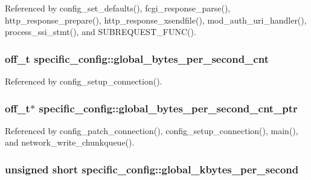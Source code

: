 Referenced by config\-\_\-set\-\_\-defaults(), fcgi\-\_\-response\-\_\-parse(), http\-\_\-response\-\_\-prepare(), http\-\_\-response\-\_\-xsendfile(), mod\-\_\-auth\-\_\-uri\-\_\-handler(), process\-\_\-ssi\-\_\-stmt(), and S\-U\-B\-R\-E\-Q\-U\-E\-S\-T\-\_\-\-F\-U\-N\-C().

\hypertarget{structspecific__config_a3a575b3037976fdaf1330ed22a01c994}{
\subsubsection[{global\-\_\-bytes\-\_\-per\-\_\-second\-\_\-cnt}]{\setlength{\rightskip}{0pt plus 5cm}off\-\_\-t specific\-\_\-config\-::global\-\_\-bytes\-\_\-per\-\_\-second\-\_\-cnt}}\label{structspecific__config_a3a575b3037976fdaf1330ed22a01c994}


Referenced by config\-\_\-setup\-\_\-connection().

\hypertarget{structspecific__config_a815ceb9b167bbc32dea17269f604d572}{
\subsubsection[{global\-\_\-bytes\-\_\-per\-\_\-second\-\_\-cnt\-\_\-ptr}]{\setlength{\rightskip}{0pt plus 5cm}off\-\_\-t$\ast$ specific\-\_\-config\-::global\-\_\-bytes\-\_\-per\-\_\-second\-\_\-cnt\-\_\-ptr}}\label{structspecific__config_a815ceb9b167bbc32dea17269f604d572}


Referenced by config\-\_\-patch\-\_\-connection(), config\-\_\-setup\-\_\-connection(), main(), and network\-\_\-write\-\_\-chunkqueue().

\hypertarget{structspecific__config_ae82d49c4aedfe0855bb20aeb79e62102}{
\subsubsection[{global\-\_\-kbytes\-\_\-per\-\_\-second}]{\setlength{\rightskip}{0pt plus 5cm}unsigned short specific\-\_\-config\-::global\-\_\-kbytes\-\_\-per\-\_\-second}}\label{structspecific__config_ae82d49c4aedfe0855bb20aeb79e62102}


